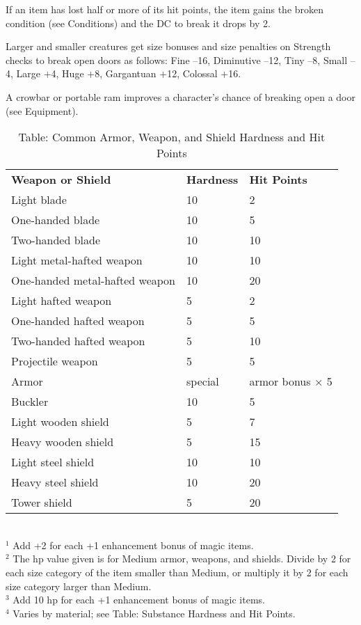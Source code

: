 If an item has lost half or more of its hit points, the item gains the broken condition (see Conditions) and the DC to break it drops by 2.
			
Larger and smaller creatures get size bonuses and size penalties on Strength checks to break open doors as follows: Fine --16, Diminutive --12, Tiny --8, Small --4, Large +4, Huge +8, Gargantuan +12, Colossal +16.
			
A crowbar or portable ram improves a character's chance of breaking open a door (see Equipment).

\begin{table}[]
\sffamily
\caption{Table: Common Armor, Weapon, and Shield Hardness and Hit Points}
\begin{tabular}{lll}
\textbf{Weapon or Shield} & \textbf{Hardness} & \textbf{Hit Points}\\
Light blade & 10 & 2 \\
 One-handed blade & 10 & 5 \\
 Two-handed blade & 10 & 10 \\
 Light metal-hafted weapon & 10 & 10 \\
 One-handed metal-hafted weapon & 10 & 20 \\
 Light hafted weapon & 5 & 2 \\
 One-handed hafted weapon & 5 & 5 \\
 Two-handed hafted weapon & 5 & 10 \\
 Projectile weapon & 5 & 5 \\
 Armor & special & armor bonus $\times$ 5 \\
 Buckler & 10 & 5 \\
 Light wooden shield & 5 & 7 \\
 Heavy wooden shield & 5 & 15 \\
 Light steel shield & 10 & 10 \\
 Heavy steel shield & 10 & 20 \\
 Tower shield & 5 & 20\\
\end{tabular}\\
\(^{1}\) Add +2 for each +1 enhancement bonus of magic items.\\
\(^{2}\) The hp value given is for Medium armor, weapons, and shields. Divide by 2 for each size category of the item smaller than Medium, or multiply it by 2 for each size category larger than Medium.\\
\(^{3}\) Add 10 hp for each +1 enhancement bonus of magic items.\\
\(^{4}\) Varies by material; see Table: Substance Hardness and Hit Points.\\					
\end{table}
        	
